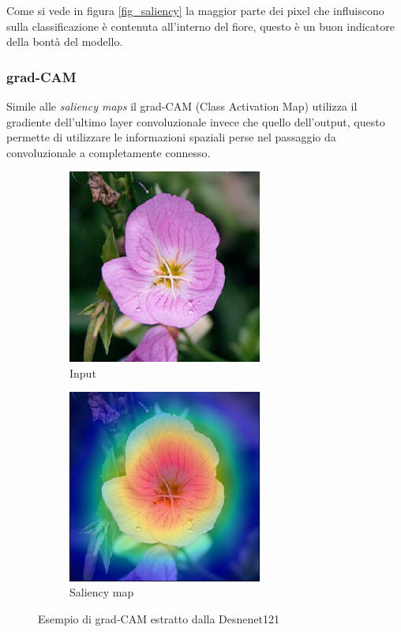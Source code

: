 Come si vede in figura \ref{fig_saliency} la maggior parte dei pixel che influiscono sulla classificazione è contenuta all'interno del fiore, questo è un buon indicatore della bontà del modello.
\subsubsection{grad-CAM}
Simile alle \textit{saliency maps} il grad-CAM (Class Activation Map) utilizza il gradiente dell'ultimo layer convoluzionale invece che quello dell'output, questo permette di utilizzare le informazioni spaziali perse nel passaggio da convoluzionale a completamente connesso.

\begin{figure}[H]
  \begin{subfigure}[b]{0.45\textwidth}
  \centering
    \includegraphics[width=0.7\textwidth]{images/saliency-input}
    \caption{Input}
  \end{subfigure}
   \hfill
  \begin{subfigure}[b]{0.45\textwidth}
  \centering
    \includegraphics[width=0.7\textwidth]{images/gradcam_guided}
    \caption{Saliency map}
  \end{subfigure}
  \caption{Esempio di grad-CAM estratto dalla Desnenet121}
  \label{fig_grad_cam}
\end{figure}

